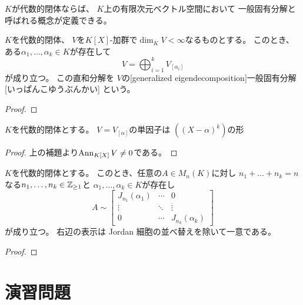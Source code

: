 \documentclass[report]{jlreq}
\begin{document}
$K$が代数的閉体ならば、
$K$上の有限次元ベクトル空間において
一般固有分解と呼ばれる概念が定義できる。

\begin{theorem}[一般固有分解]
    $K$を代数的閉体、
    $V$を$K[X]$-加群で$\dim_K V < \infty$なるものとする。
    このとき、ある$\alpha_1, \dots, \alpha_k \in K$が存在して
    \begin{equation}
        V = \bigoplus_{i = 1}^k V_{[\alpha_i]}
    \end{equation}
    が成り立つ。
    この直和分解を
    $V$の[generalized eigendecomposition]{一般固有分解}[いっぱんこゆうぶんかい]
    という。
\end{theorem}

\begin{proof}
    \TODO{}
\end{proof}

\begin{lemma}
    $K$を代数的閉体とする。
    $V = V_{[\alpha]}$の単因子は
    $((X - \alpha)^k)$の形
    \TODO{}
\end{lemma}

\begin{proof}
    上の補題より$\operatorname{Ann}_{K[X]} V \neq 0$である。
    \TODO{}
\end{proof}

\begin{corollary}
    $K$を代数的閉体とする。
    このとき、任意の$A \in M_n(K)$に対し
    $n_1 + \dots + n_k = n$なる$n_1, \dots, n_k \in \mathbb{Z}_{\ge 1}$と
    $\alpha_1, \dots, \alpha_k \in K$が存在し
    \begin{equation}
        A \sim \begin{bmatrix}
            J_{n_1}(\alpha_1) & \cdots & 0 \\
            \vdots & \ddots & \vdots \\
            0 & \cdots & J_{n_k}(\alpha_k)
        \end{bmatrix}
    \end{equation}
    が成り立つ。
    右辺の表示は Jordan 細胞の並べ替えを除いて一意である。
\end{corollary}

\begin{proof}
    \TODO{}
\end{proof}

%
\newpage
\section{演習問題}
\end{document}
